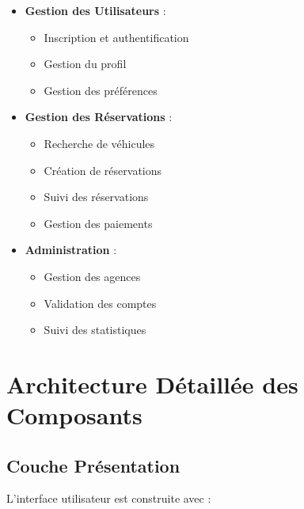 \begin{itemize}
    \item \textbf{Gestion des Utilisateurs} :
    \begin{itemize}
        \item Inscription et authentification
        \item Gestion du profil
        \item Gestion des préférences
    \end{itemize}
    
    \item \textbf{Gestion des Réservations} :
    \begin{itemize}
        \item Recherche de véhicules
        \item Création de réservations
        \item Suivi des réservations
        \item Gestion des paiements
    \end{itemize}
    
    \item \textbf{Administration} :
    \begin{itemize}
        \item Gestion des agences
        \item Validation des comptes
        \item Suivi des statistiques
    \end{itemize}
\end{itemize}

\section{Architecture Détaillée des Composants}

\subsection{Couche Présentation}
L'interface utilisateur est construite avec :

